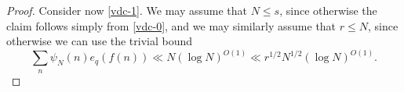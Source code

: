 \documentclass[12pt,a4paper,reqno]{amsart}
\numberwithin{equation}{section}
\theoremstyle{plain}
\theoremstyle{definition}
\newcommand\Z{\mathbb{Z}}
\renewcommand{\lessapprox}{\llcurly}
\begin{document}
\begin{proof}

Consider now \eqref{vdc-1}.  We may assume that $N \leq s$, since
otherwise the claim follows simply from \eqref{vdc-0}, and we may
similarly assume that $ r\leq N$, since otherwise we can use
the trivial bound
$$
\sum_n \psi_N(n) e_q(f(n)) \ll N(\log N)^{O(1)}\ll r^{1/2}N^{1/2}(\log
N)^{O(1)}.
$$


\end{proof}
\end{document}
